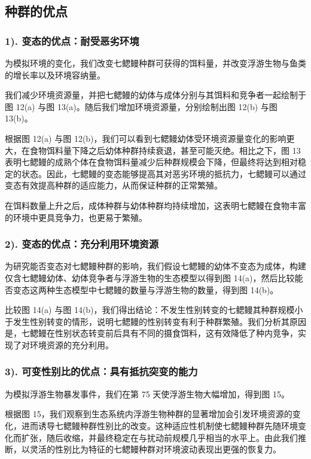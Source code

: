 \documentclass[11pt,a4paper]{ctexart}
\begin{document}
\subsection{种群的优点}

\subsubsection*{1). 变态的优点：耐受恶劣环境}

为模拟环境的变化，我们改变七鳃鳗种群可获得的饵料量，并改变浮游生物与鱼类的增长率以及环境容纳量。

我们减少环境资源量，并把七鳃鳗的幼体与成体分别与其饵料和竞争者一起绘制于图 12(a) 与图 13(a)。随后我们增加环境资源量，分别绘制出图 12(b) 与图 13(b)。

根据图 12(a) 与图 12(b)，我们可以看到七鳃鳗幼体受环境资源量变化的影响更大，在食物饵料量下降之后幼体种群持续衰退，甚至可能灭绝。相比之下，图 13 表明七鳃鳗的成熟个体在食物饵料量减少后种群规模会下降，但最终将达到相对稳定的状态。因此，七鳃鳗的变态能够提高其对恶劣环境的抵抗力，七鳃鳗可以通过变态有效提高种群的适应能力，从而保证种群的正常繁殖。

在饵料数量上升之后，成体种群与幼体种群均持续增加，这表明七鳃鳗在食物丰富的环境中更具竞争力，也更易于繁殖。

\subsubsection*{2). 变态的优点：充分利用环境资源}

为研究能否变态对七鳃鳗种群的影响，我们假设七鳃鳗的幼体不变态为成体，构建仅含七鳃鳗幼体、幼体竞争者与浮游生物的生态模型以得到图 14(a)，然后比较能否变态这两种生态模型中七鳃鳗的数量与浮游生物的数量，得到图 14(b)。

比较图 14(a) 与图 14(b)，我们得出结论：不发生性别转变的七鳃鳗其种群规模小于发生性别转变的情形，说明七鳃鳗的性别转变有利于种群繁殖。我们分析其原因是，七鳃鳗在性别状态转变前后具有不同的摄食饵料，这有效降低了种内竞争，实现了对环境资源的充分利用。

\subsubsection*{3). 可变性别比的优点：具有抵抗突变的能力}

为模拟浮游生物暴发事件，我们在第 75 天使浮游生物大幅增加，得到图 15。

根据图 15，我们观察到生态系统内浮游生物种群的显著增加会引发环境资源的变化，进而诱导七鳃鳗种群性别比的改变。这种适应性机制使七鳃鳗种群先随环境变化而扩张，随后收缩，并最终稳定在与扰动前规模几乎相当的水平上。由此我们推断，以灵活的性别比为特征的七鳃鳗种群对环境波动表现出更强的恢复力。
\end{document}
